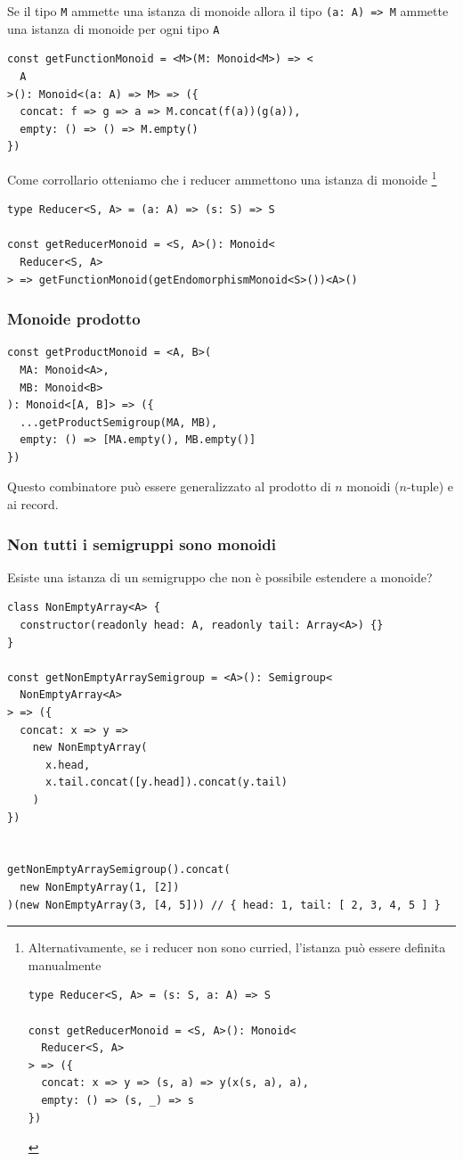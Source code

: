 \documentclass[12pt]{article}
\begin{document}
Se il tipo \texttt{M} ammette una istanza di monoide allora il tipo \texttt{(a: A) => M} ammette una istanza di monoide per ogni tipo \texttt{A}

\begin{verbatim}
const getFunctionMonoid = <M>(M: Monoid<M>) => <
  A
>(): Monoid<(a: A) => M> => ({
  concat: f => g => a => M.concat(f(a))(g(a)),
  empty: () => () => M.empty()
})
\end{verbatim}

Come corrollario otteniamo che i reducer ammettono una istanza di monoide
\footnote{Alternativamente, se i reducer non sono curried, l'istanza può essere definita manualmente

\begin{verbatim}
type Reducer<S, A> = (s: S, a: A) => S

const getReducerMonoid = <S, A>(): Monoid<
  Reducer<S, A>
> => ({
  concat: x => y => (s, a) => y(x(s, a), a),
  empty: () => (s, _) => s
})
\end{verbatim}

}

\begin{verbatim}
type Reducer<S, A> = (a: A) => (s: S) => S

const getReducerMonoid = <S, A>(): Monoid<
  Reducer<S, A>
> => getFunctionMonoid(getEndomorphismMonoid<S>())<A>()
\end{verbatim}

\subsubsection{Monoide prodotto}

\begin{verbatim}
const getProductMonoid = <A, B>(
  MA: Monoid<A>,
  MB: Monoid<B>
): Monoid<[A, B]> => ({
  ...getProductSemigroup(MA, MB),
  empty: () => [MA.empty(), MB.empty()]
})
\end{verbatim}

Questo combinatore può essere generalizzato al prodotto di $n$ monoidi ($n$-tuple) e ai record.

\subsubsection{Non tutti i semigruppi sono monoidi}

Esiste una istanza di un semigruppo che non è possibile estendere a monoide?

\begin{verbatim}
class NonEmptyArray<A> {
  constructor(readonly head: A, readonly tail: Array<A>) {}
}

const getNonEmptyArraySemigroup = <A>(): Semigroup<
  NonEmptyArray<A>
> => ({
  concat: x => y =>
    new NonEmptyArray(
      x.head,
      x.tail.concat([y.head]).concat(y.tail)
    )
})


getNonEmptyArraySemigroup().concat(
  new NonEmptyArray(1, [2])
)(new NonEmptyArray(3, [4, 5])) // { head: 1, tail: [ 2, 3, 4, 5 ] }
\end{verbatim}
\end{document}
